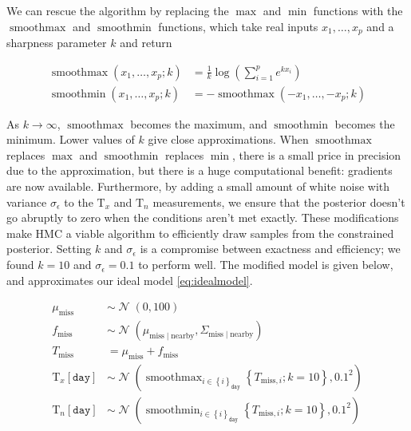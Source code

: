 \documentclass[letter]{article}
\newcommand{\genericdel}[3]{%
      \left#1#3\right#2
    }
\newcommand{\del}[1]{\genericdel(){#1}}
\newcommand{\sbr}[1]{\genericdel[]{#1}}
\newcommand{\cbr}[1]{\genericdel\{\}{#1}}
\DeclareMathOperator{\normal}{\mathcal{N}}
\newcommand{\T}{\mathrm{T}}
\newcommand{\Tn}{\T_{n}}
\newcommand{\Tx}{\T_{x}}
\newcommand{\miss}{\mathrm{miss}}
\newcommand{\obs}{\mathrm{nearby}}
\DeclareMathOperator*{\softmax}{smoothmax}
\DeclareMathOperator*{\softmin}{smoothmin}
\newcommand{\iday}{\mathtt{day}}
\newcommand{\dayset}[1]{\cbr{i}_{#1}}
\begin{document}
We can rescue the algorithm by replacing the \(\max\) and \(\min\)
functions with the \(\softmax\) and \(\softmin\) functions, which take
real inputs \(x_1, \ldots, x_p\) and a sharpness parameter \(k\) and
return

\begin{equation}
\begin{split}
    \softmax\del{x_1, \ldots, x_p ; k} &= \frac{1}{k} \log\del{\sum_{i=1}^p e^{kx_i}} \\
    \softmin\del{x_1, \ldots, x_p ; k} &= -\softmax\del{-x_1, \ldots, -x_p; k}
\end{split}
\end{equation}

As \(k \rightarrow \infty\), \(\softmax\) becomes the maximum, and
\(\softmin\) becomes the minimum. Lower values of \(k\) give close
approximations. When \(\softmax\) replaces \(\max\) and \(\softmin\)
replaces \(\min\), there is a small price in precision due to the
approximation, but there is a huge computational benefit: gradients are
now available. Furthermore, by adding a small amount of white noise with
variance \(\sigma_\epsilon\) to the \(\Tx\) and \(\Tn\) measurements, we
ensure that the posterior doesn't go abruptly to zero when the
conditions aren't met exactly. These modifications make HMC a viable
algorithm to efficiently draw samples from the constrained posterior.
Setting \(k\) and \(\sigma_\epsilon\) is a compromise between exactness
and efficiency; we found \(k=10\) and \(\sigma_\epsilon=0.1\) to perform
well. The modified model is given below, and approximates our ideal
model \eqref{eq:idealmodel}.

\begin{equation}
\label{eq:smoothed_model}
\begin{split}
    \mu_\miss &\sim \normal\del{0,100} \\
    f_\miss &\sim \normal\del{\mu_{\miss \mid \obs}, \Sigma_{\miss \mid \obs}} \\
    T_\miss &= \mu_\miss + f_\miss \\
    \Tx\sbr{\iday} &\sim \normal\del{\softmax_{i \in \dayset{\iday}} \cbr{ T_{\miss,i}; k=10}, 0.1^2} \\
    \Tn\sbr{\iday} &\sim \normal\del{\softmin_{i \in \dayset{\iday}} \cbr{ T_{\miss,i}; k=10}, 0.1^2}
\end{split}
\end{equation}
\end{document}
